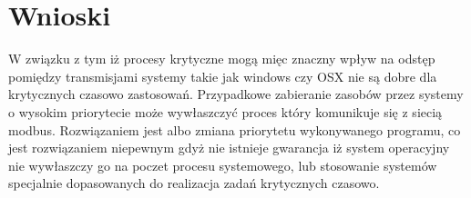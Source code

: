 \documentclass[paper=a4, fontsize=11pt]{scrartcl} %
\numberwithin{equation}{section} %
\numberwithin{figure}{section} %
\numberwithin{table}{section} %
\begin{document}
\section{Wnioski}


W związku z tym iż procesy krytyczne mogą mięc znaczny wpływ na odstęp pomiędzy transmisjami systemy takie jak windows czy OSX nie są dobre
dla krytycznych czasowo zastosowań. Przypadkowe zabieranie zasobów przez systemy o wysokim priorytecie może wywłaszczyć proces który komunikuje się
z siecią modbus. Rozwiązaniem jest albo zmiana priorytetu wykonywanego programu, co jest rozwiązaniem niepewnym gdyż nie istnieje gwarancja
iż system operacyjny nie wywłaszczy go na poczet procesu systemowego, lub stosowanie systemów specjalnie dopasowanych do realizacja zadań
krytycznych czasowo.
\end{document}
